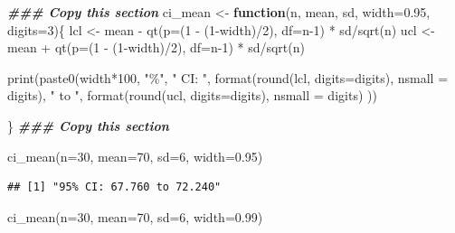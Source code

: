 \documentclass[
]{memoir}
\newenvironment{Shaded}{\begin{snugshade}}{\end{snugshade}}
\newcommand{\AttributeTok}[1]{\textcolor[rgb]{0.77,0.63,0.00}{#1}}
\newcommand{\ControlFlowTok}[1]{\textcolor[rgb]{0.13,0.29,0.53}{\textbf{#1}}}
\newcommand{\DecValTok}[1]{\textcolor[rgb]{0.00,0.00,0.81}{#1}}
\newcommand{\DocumentationTok}[1]{\textcolor[rgb]{0.56,0.35,0.01}{\textbf{\textit{#1}}}}
\newcommand{\FloatTok}[1]{\textcolor[rgb]{0.00,0.00,0.81}{#1}}
\newcommand{\FunctionTok}[1]{\textcolor[rgb]{0.00,0.00,0.00}{#1}}
\newcommand{\NormalTok}[1]{#1}
\newcommand{\OtherTok}[1]{\textcolor[rgb]{0.56,0.35,0.01}{#1}}
\newcommand{\SpecialCharTok}[1]{\textcolor[rgb]{0.00,0.00,0.00}{#1}}
\newcommand{\StringTok}[1]{\textcolor[rgb]{0.31,0.60,0.02}{#1}}
\begin{document}
\begin{Shaded}
\begin{Highlighting}[]
\DocumentationTok{\#\#\# Copy this section}
\NormalTok{ci\_mean }\OtherTok{\textless{}{-}} \ControlFlowTok{function}\NormalTok{(n, mean, sd, }\AttributeTok{width=}\FloatTok{0.95}\NormalTok{, }\AttributeTok{digits=}\DecValTok{3}\NormalTok{)\{}
\NormalTok{  lcl }\OtherTok{\textless{}{-}}\NormalTok{ mean }\SpecialCharTok{{-}} \FunctionTok{qt}\NormalTok{(}\AttributeTok{p=}\NormalTok{(}\DecValTok{1} \SpecialCharTok{{-}}\NormalTok{ (}\DecValTok{1}\SpecialCharTok{{-}}\NormalTok{width)}\SpecialCharTok{/}\DecValTok{2}\NormalTok{), }\AttributeTok{df=}\NormalTok{n}\DecValTok{{-}1}\NormalTok{) }\SpecialCharTok{*}\NormalTok{ sd}\SpecialCharTok{/}\FunctionTok{sqrt}\NormalTok{(n)}
\NormalTok{  ucl }\OtherTok{\textless{}{-}}\NormalTok{ mean }\SpecialCharTok{+} \FunctionTok{qt}\NormalTok{(}\AttributeTok{p=}\NormalTok{(}\DecValTok{1} \SpecialCharTok{{-}}\NormalTok{ (}\DecValTok{1}\SpecialCharTok{{-}}\NormalTok{width)}\SpecialCharTok{/}\DecValTok{2}\NormalTok{), }\AttributeTok{df=}\NormalTok{n}\DecValTok{{-}1}\NormalTok{) }\SpecialCharTok{*}\NormalTok{ sd}\SpecialCharTok{/}\FunctionTok{sqrt}\NormalTok{(n)}
  
  \FunctionTok{print}\NormalTok{(}\FunctionTok{paste0}\NormalTok{(width}\SpecialCharTok{*}\DecValTok{100}\NormalTok{, }\StringTok{"\%"}\NormalTok{, }\StringTok{" CI: "}\NormalTok{, }\FunctionTok{format}\NormalTok{(}\FunctionTok{round}\NormalTok{(lcl, }\AttributeTok{digits=}\NormalTok{digits), }\AttributeTok{nsmall =}\NormalTok{ digits),}
               \StringTok{" to "}\NormalTok{, }\FunctionTok{format}\NormalTok{(}\FunctionTok{round}\NormalTok{(ucl, }\AttributeTok{digits=}\NormalTok{digits), }\AttributeTok{nsmall =}\NormalTok{ digits) ))}

\NormalTok{\}}
\DocumentationTok{\#\#\# Copy this section}

\FunctionTok{ci\_mean}\NormalTok{(}\AttributeTok{n=}\DecValTok{30}\NormalTok{, }\AttributeTok{mean=}\DecValTok{70}\NormalTok{, }\AttributeTok{sd=}\DecValTok{6}\NormalTok{, }\AttributeTok{width=}\FloatTok{0.95}\NormalTok{)}
\end{Highlighting}
\end{Shaded}

\begin{verbatim}
## [1] "95% CI: 67.760 to 72.240"
\end{verbatim}

\begin{Shaded}
\begin{Highlighting}[]
\FunctionTok{ci\_mean}\NormalTok{(}\AttributeTok{n=}\DecValTok{30}\NormalTok{, }\AttributeTok{mean=}\DecValTok{70}\NormalTok{, }\AttributeTok{sd=}\DecValTok{6}\NormalTok{, }\AttributeTok{width=}\FloatTok{0.99}\NormalTok{)}
\end{Highlighting}
\end{Shaded}
\end{document}
